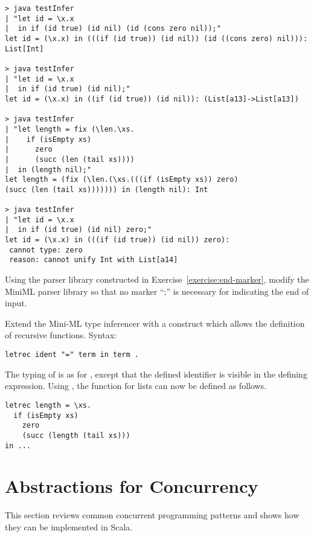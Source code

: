 {{\begin{lstlisting}
> java testInfer 
| "let id = \x.x  
|  in if (id true) (id nil) (id (cons zero nil));"
let id = (\x.x) in (((if (id true)) (id nil)) (id ((cons zero) nil))): List[Int]

> java testInfer
| "let id = \x.x 
|  in if (id true) (id nil);"
let id = (\x.x) in ((if (id true)) (id nil)): (List[a13]->List[a13])

> java testInfer
| "let length = fix (\len.\xs.
|    if (isEmpty xs) 
|      zero 
|      (succ (len (tail xs))))
|  in (length nil);"
let length = (fix (\len.(\xs.(((if (isEmpty xs)) zero) 
(succ (len (tail xs))))))) in (length nil): Int

> java testInfer 
| "let id = \x.x 
|  in if (id true) (id nil) zero;"
let id = (\x.x) in (((if (id true)) (id nil)) zero): 
 cannot type: zero
 reason: cannot unify Int with List[a14]
\end{lstlisting}

\begin{exercise}\label{exercise:hm-parse} Using the parser library constructed in
Exercise~\ref{exercise:end-marker}, modify the MiniML parser library
so that no marker ``;'' is necessary for indicating the end of input.
\end{exercise}
}

\begin{exercise}\label{execcise:hm-extend} Extend the Mini-ML  type
inferencer with a  construct which allows the definition of
recursive functions. Syntax:
\begin{lstlisting}
letrec ident "=" term in term .
\end{lstlisting}
The typing of  is as for , 
except that the defined identifier is visible in the defining expression. Using , the  function for lists can now be defined as follows.
\begin{lstlisting}
letrec length = \xs.
  if (isEmpty xs)
    zero
    (succ (length (tail xs)))
in ...
\end{lstlisting}
\end{exercise}

\chapter{Abstractions for Concurrency}\label{sec:ex-concurrency}

This section reviews common concurrent programming patterns and shows
how they can be implemented in Scala.

}
